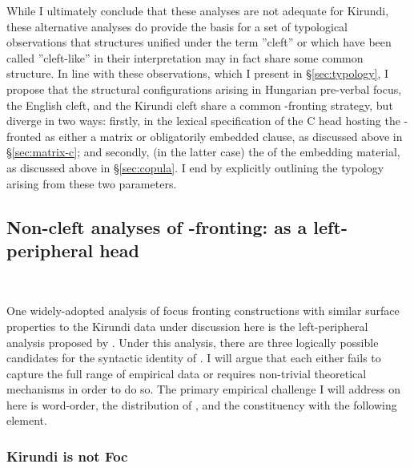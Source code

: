 \documentclass[12pt]{article}
\begin{document}
While I ultimately conclude that these analyses are not adequate for Kirundi, these alternative analyses do provide the basis for a set of typological observations that structures unified under the term ''cleft'' or which have been called ''cleft-like'' in their interpretation may in fact share some common structure. In line with these observations, which I present in \S\ref{sec:typology}, I propose that the structural configurations arising in Hungarian pre-verbal focus, the English cleft, and the Kirundi cleft share a common \abar{}-fronting strategy, but diverge in two ways: firstly, in the lexical specification of the C head hosting the \abar{}-fronted as either a matrix or obligatorily embedded clause, as discussed above in \S\ref{sec:matrix-c}; and secondly,  (in the latter case) the  of the embedding material, as discussed above in \S\ref{sec:copula}. I end by explicitly outlining the typology arising from these two parameters. 

\subsection{Non-cleft analyses of \abar{}-fronting:  as a left-peripheral head} \label{sec:left-peripheral-ni}\

One widely-adopted analysis of focus fronting constructions with similar surface properties to the Kirundi data under discussion here is the left-peripheral analysis proposed by \citet{rizzi-1997}. Under this analysis, there are three logically possible candidates for the syntactic identity of .\footnotemark{} I will argue that each either fails to capture the full range of empirical data or requires non-trivial theoretical mechanisms in order to do so. The primary empirical challenge I will address on here is word-order, the distribution of , and the constituency with the following element.


\subsubsection{Kirundi  is not Foc}
\end{document}
